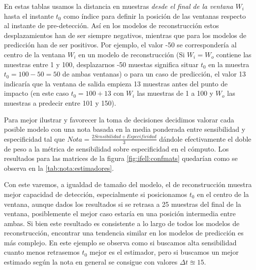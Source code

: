 En estas tablas usamos la distancia en muestras \textit{desde el final de la ventana $W_i$} hasta el instante $t_0$ como índice para definir la posición de las ventanas respecto al instante de pre-detección. Así en los modelos de reconstrucción estos desplazamientos han de ser siempre negativos, mientras que para los modelos de predicción han de ser positivos. Por ejemplo, el valor -50 se correspondería al centro de la ventana $W_i$ en un modelo de reconstrucción (Si $W_i=W_o$ contiene las muestras entre 1 y 100, desplazarnos -50 muestas significa situar $t_0$ en la muestra $t_0=100-50 = 50$ de ambas ventanas) o para un caso de predicción, el valor 13 indicaría que la ventana de salida empieza 13 muestras antes del punto de impacto (en este caso $t_0 = 100 + 13$ con $W_i$ las muestras de 1 a 100 y $W_o$ las muestras a predecir entre 101 y 150).

Para mejor ilustrar y favorecer la toma de decisiones decidimos valorar cada posible modelo con una nota basada en la media ponderada entre sensibilidad y especificidad tal que $Nota=\frac{2Sensibilidad+Especificidad}{3}$ dándole efectivamente el doble de peso a la métrica de sensibilidad sobre especificidad en el cómputo. Los resultados para las matrices de la figura \ref{fig:ifell:confmats} quedarían como se observa en la \autoref{tab:nota:estimadores}.


Con este varemos, a igualdad de tamaño del modelo, el de reconstrucción muestra mejor capacidad de detección, especialmente si posicionamos $t_0$ en el centro de la ventana, aunque dados los resultados si se retrasa a 25 muestras del final de la ventana, posiblemente el mejor caso estaría en una posición intermedia entre ambas. Si bien este resultado es consistente a lo largo de todos los modelos de reconstrucción, encontrar una tendencia similar en los modelos de predicción es más complejo. En este ejemplo se observa como si buscamos alta sensibilidad cuanto menos retrasemos $t_0$ mejor es el estimador, pero si buscamos un mejor estimado según la nota en general se consigue con valores $\Delta t \approxeq 15$. 

